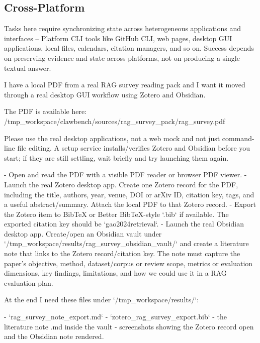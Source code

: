 \subsection{Cross-Platform}\label{app:examples:cross-platform}

Tasks here require synchronizing state across heterogeneous
applications and interfaces -- Platform CLI tools like GitHub CLI, web pages, desktop GUI applications,
local files, calendars, citation managers, and so on. Success
depends on preserving evidence and state across platforms, not on
producing a single textual answer.

\begin{clawcode}[title={\texttt{task\_01\_rag\_survey\_gui\_zotero\_obsidian}}]
I have a local PDF from a real RAG survey reading pack and I want it
moved through a real desktop GUI workflow using Zotero and Obsidian.

The PDF is available here:
    /tmp_workspace/clawbench/sources/rag_survey_pack/rag_survey.pdf

Please use the real desktop applications, not a web mock and not just
command-line file editing. A setup service installs/verifies Zotero
and Obsidian before you start; if they are still settling, wait
briefly and try launching them again.

- Open and read the PDF with a visible PDF reader or browser PDF
  viewer.
- Launch the real Zotero desktop app. Create one Zotero record for
  the PDF, including the title, authors, year, venue, DOI or arXiv
  ID, citation key, tags, and a useful abstract/summary. Attach the
  local PDF to that Zotero record.
- Export the Zotero item to BibTeX or Better BibTeX-style `.bib` if
  available. The exported citation key should be `gao2024retrieval`.
- Launch the real Obsidian desktop app. Create/open an Obsidian vault
  under `/tmp_workspace/results/rag_survey_obsidian_vault/` and
  create a literature note that links to the Zotero
  record/citation key. The note must capture the paper's objective,
  method, dataset/corpus or review scope, metrics or evaluation
  dimensions, key findings, limitations, and how we could use it in
  a RAG evaluation plan.

At the end I need these files under `/tmp_workspace/results/`:

- `rag_survey_note_export.md`
- `zotero_rag_survey_export.bib`
- the literature note .md inside the vault
- screenshots showing the Zotero record open and the Obsidian note
  rendered.
\end{clawcode}

